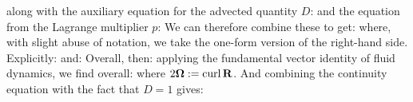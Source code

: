 \documentclass[10pt]{article}
\begin{document}
along with the auxiliary equation for the advected quantity $D$:
and the equation from the Lagrange multiplier $p$:
We can therefore combine these to get:
where, with slight abuse of notation, we take the one-form version of the right-hand side. Explicitly:
and:
Overall, then:
applying the fundamental vector identity of fluid dynamics, we find overall:
where $2\mathbf{\Omega} : = \operatorname{curl}{\mathbf{R}}$. And combining the continuity equation with the fact that $D = 1$ gives:
\end{document}

